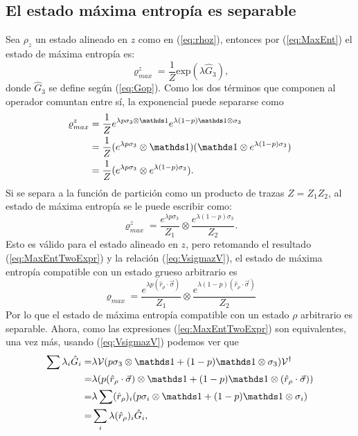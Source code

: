 \subsection{El estado máxima entropía es separable}

Sea $\rho_{z}$ un estado alineado en $z$ como en (\ref{eq:rhoz}), entonces por (\ref{eq:MaxEnt}) el estado de máxima entropía es:
\begin{equation}\label{eq:MaxEntUgly}
\varrho_{max}^{z}=\frac{1}{Z}\text{exp}(\lambda\hat{G}_{3}),
\end{equation}
donde $\hat{G}_{3}$ se define según (\ref{eq:Gop}). Como los dos términos que componen al operador comuntan entre sí, la exponencial puede separarse como
\begin{align*}
\varrho_{max}^{z}&=\frac{1}{Z}e^{\lambda p\sigma_{3}\otimes\Id}e^{\lambda(1-p)\Id\otimes\sigma_{3}}\\
&=\frac{1}{Z}(e^{\lambda p\sigma_{3}}\otimes\Id)( \Id\otimes e^{\lambda(1-p)\sigma_{3}})\\
&=\frac{1}{Z}(e^{\lambda p\sigma_{3}}\otimes e^{\lambda(1-p)\sigma_{3}}).\\
\end{align*}
Si se separa a la función de partición como un producto de trazas $Z=Z_{1}Z_{2}$, al estado de máxima entropía se le puede escribir como:
\begin{equation}\label{eq:MaxEntZ}
\varrho_{max}^{z}=\frac{e^{\lambda p\sigma_{3}}}{Z_{1}} \otimes \frac{e^{\lambda(1-p)\sigma_{3}}}{Z_{2}}.
\end{equation}
Esto es válido para el estado alineado en $z$, pero retomando el resultado (\ref{eq:MaxEntTwoExpr}) y la relación (\ref{eq:VsigmazV}), el estado de máxima entropía compatible con un estado grueso arbitrario es
\begin{equation}\label{eq:MaxEntSeparable}
  \varrho_{max}=\frac{e^{\lambda p(\hat{r}_{\rho}\cdot\vec{\sigma})}}{Z_{1}} \otimes \frac{e^{\lambda(1-p)(\hat{r}_{\rho}\cdot\vec{\sigma})}}{Z_{2}}
\end{equation}
Por lo que el estado de máxima entropía compatible con un estado $\rho$ arbitrario es separable. Ahora, como las expresiones (\ref{eq:MaxEntTwoExpr}) son equivalentes, una vez más, usando (\ref{eq:VsigmazV}) podemos ver que
\begin{align*}
  \sum\lambda_{i}\hat{G}_{i}=&\lambda\mcV(p\sigma_{3}\otimes\Id+(1-p)\Id\otimes\sigma_{3})\mcV^{\dag}\\
  =&\lambda(p(\hat{r}_{\rho}\cdot\vec{\sigma})\otimes\Id+(1-p)\Id\otimes(\hat{r}_{\rho}\cdot\vec{\sigma}))\\
  =& \lambda\sum(\hat{r}_{\rho})_{i}(p\sigma_{i}\otimes\Id+(1-p)\Id\otimes\sigma_{i})\\
  =&\sum_{i}\lambda(\hat{r}_{\rho})_{i}\hat{G}_{i},
\end{align*}
